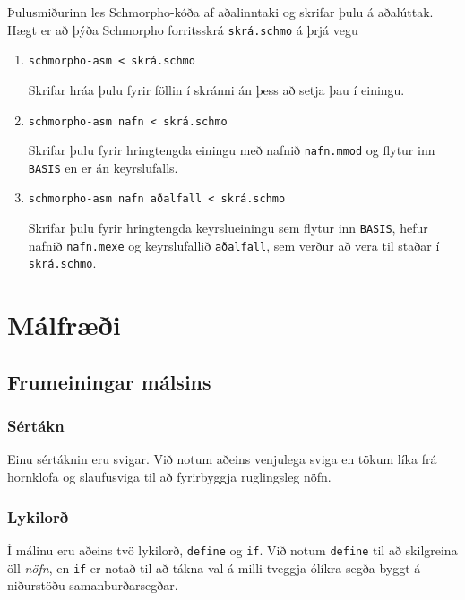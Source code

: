 \documentclass[a4paper,icelandic]{article}
\begin{document}
Þulusmiðurinn les Schmorpho-kóða af aðalinntaki og skrifar þulu á
aðalúttak. Hægt er að þýða Schmorpho forritsskrá \verb|skrá.schmo| á
þrjá vegu
\begin{enumerate}
\item
\begin{verbatim}
schmorpho-asm < skrá.schmo
\end{verbatim}
  Skrifar hráa þulu fyrir föllin í skránni án þess að setja þau í einingu.
\item
\begin{verbatim}
schmorpho-asm nafn < skrá.schmo
\end{verbatim}
  Skrifar þulu fyrir hringtengda einingu með nafnið \verb|nafn.mmod|
  og flytur inn \verb|BASIS| en er án keyrslufalls.
\item
\begin{verbatim}
schmorpho-asm nafn aðalfall < skrá.schmo
\end{verbatim}
  Skrifar þulu fyrir hringtengda keyrslueiningu sem flytur inn
  \verb|BASIS|, hefur nafnið \verb|nafn.mexe| og keyrslufallið
  \verb|aðalfall|, sem verður að vera til staðar í \verb|skrá.schmo|.
\end{enumerate}

\section{Málfræði}
\label{sec:malfradi}

\subsection{Frumeiningar málsins}
\label{sec:frumeiningar-malsins}

\subsubsection{Sértákn}
\label{sec:sertakn}
Einu sértáknin eru svigar. Við notum aðeins venjulega sviga en tökum
líka frá hornklofa og slaufusviga til að fyrirbyggja ruglingsleg nöfn.

\subsubsection{Lykilorð}
\label{sec:lykilord}
Í málinu eru aðeins tvö lykilorð, \verb|define| og \verb|if|. Við
notum \verb|define| til að skilgreina öll \emph{nöfn}, en \verb|if| er
notað til að tákna val á milli tveggja ólíkra segða byggt á niðurstöðu
samanburðarsegðar.
\end{document}
